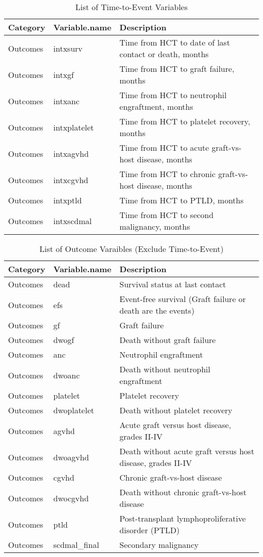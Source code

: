 \documentclass[11pt,]{article}
\begin{document}
\begin{longtable}[t]{|>{}ll>{}l|}
\caption{\label{tab:unnamed-chunk-6}List of Time-to-Event Variables}\\
\toprule
Category & Variable.name & Description\\
\midrule
Outcomes & intxsurv & Time from HCT to date of last contact or death, months\\
Outcomes & intxgf & Time from HCT to graft failure, months\\
Outcomes & intxanc & Time from HCT to neutrophil engraftment, months\\
Outcomes & intxplatelet & Time from HCT to platelet recovery, months\\
Outcomes & intxagvhd & Time from HCT to acute graft-vs-host disease, months\\
\addlinespace
Outcomes & intxcgvhd & Time from HCT to chronic graft-vs-host disease, months\\
Outcomes & intxptld & Time from HCT to PTLD, months\\
Outcomes & intxscdmal & Time from HCT to second malignancy, months\\
\bottomrule
\end{longtable}

\pagebreak

\begin{longtable}[t]{|>{}ll>{}l|}
\caption{\label{tab:unnamed-chunk-7}List of Outcome Varaibles (Exclude Time-to-Event)}\\
\toprule
Category & Variable.name & Description\\
\midrule
Outcomes & dead & Survival status at last contact\\
Outcomes & efs & Event-free survival (Graft failure or death are the events)\\
Outcomes & gf & Graft failure\\
Outcomes & dwogf & Death without graft failure\\
Outcomes & anc & Neutrophil engraftment\\
\addlinespace
Outcomes & dwoanc & Death without neutrophil engraftment\\
Outcomes & platelet & Platelet recovery\\
Outcomes & dwoplatelet & Death without platelet recovery\\
Outcomes & agvhd & Acute graft versus host disease, grades II-IV\\
Outcomes & dwoagvhd & Death without acute graft versus host disease, grades II-IV\\
\addlinespace
Outcomes & cgvhd & Chronic graft-vs-host disease\\
Outcomes & dwocgvhd & Death without chronic graft-vs-host disease\\
Outcomes & ptld & Post-transplant lymphoproliferative disorder (PTLD)\\
Outcomes & scdmal\_final & Secondary malignancy\\
\bottomrule
\end{longtable}

\clearpage
\nocite{*}


\end{document}
